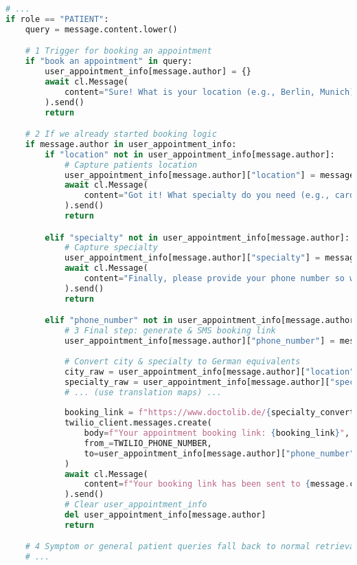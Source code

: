 \begin{lstlisting}[language=Python, caption={Symptom Analysis \& Appointment Booking Snippet}, basicstyle=\small\ttfamily]
# ...
if role == "PATIENT":
    query = message.content.lower()

    # 1 Trigger for booking an appointment
    if "book an appointment" in query:
        user_appointment_info[message.author] = {}
        await cl.Message(
            content="Sure! What is your location (e.g., Berlin, Munich)?"
        ).send()
        return

    # 2 If we already started booking logic
    if message.author in user_appointment_info:
        if "location" not in user_appointment_info[message.author]:
            # Capture patients location
            user_appointment_info[message.author]["location"] = message.content
            await cl.Message(
                content="Got it! What specialty do you need (e.g., cardiology, dermatology)?"
            ).send()
            return

        elif "specialty" not in user_appointment_info[message.author]:
            # Capture specialty
            user_appointment_info[message.author]["specialty"] = message.content
            await cl.Message(
                content="Finally, please provide your phone number so we can send the booking link."
            ).send()
            return

        elif "phone_number" not in user_appointment_info[message.author]:
            # 3 Final step: generate & SMS booking link
            user_appointment_info[message.author]["phone_number"] = message.content
            
            # Convert city & specialty to German equivalents
            city_raw = user_appointment_info[message.author]["location"].strip()
            specialty_raw = user_appointment_info[message.author]["specialty"].strip()
            # ... (use translation maps) ...
            
            booking_link = f"https://www.doctolib.de/{specialty_converted}/{city_converted}"
            twilio_client.messages.create(
                body=f"Your appointment booking link: {booking_link}",
                from_=TWILIO_PHONE_NUMBER,
                to=user_appointment_info[message.author]["phone_number"]
            )
            await cl.Message(
                content=f"Your booking link has been sent to {message.content}."
            ).send()
            # Clear user_appointment_info
            del user_appointment_info[message.author]
            return

    # 4 Symptom or general patient queries fall back to normal retrieval + LLM
    # ...
\end{lstlisting}

